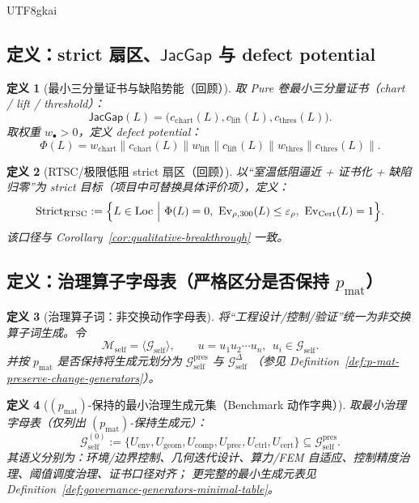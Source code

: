 \documentclass[12pt]{article}
\newtheorem{definition}{定义}[section]
\newcommand{\JacGap}{\ensuremath{\mathsf{JacGap}}}
\newcommand{\RTSC}{\textsf{RTSC}}
\begin{document}
\begin{CJK*}{UTF8}{gkai}
\subsection{定义：strict 扇区、$\JacGap$ 与 defect potential}

\begin{definition}[最小三分量证书与缺陷势能（回顾）]
\label{def:markdown-jacgap-phi}
取 Pure 卷最小三分量证书（chart / lift / threshold）：
\[
\JacGap(L)=\bigl(c_{\mathrm{chart}}(L),c_{\mathrm{lift}}(L),c_{\mathrm{thres}}(L)\bigr).
\]
取权重 $w_\bullet>0$，定义 defect potential：
\[
\Phi(L)=w_{\mathrm{chart}}\|c_{\mathrm{chart}}(L)\|
w_{\mathrm{lift}}\|c_{\mathrm{lift}}(L)\|
w_{\mathrm{thres}}\|c_{\mathrm{thres}}(L)\|.
\]
\end{definition}

\begin{definition}[\RTSC{}/极限低阻 strict 扇区（回顾）]
\label{def:markdown-strict-sector}
以“室温低阻逼近 + 证书化 + 缺陷归零”为 strict 目标（项目中可替换具体评价项），定义：
\[
\mathrm{Strict}_{\mathrm{RTSC}}
:=
\Bigl\{
L\in\mathrm{Loc}\ \Big|\ \Phi(L)=0,\ \mathrm{Ev}_{\rho,300}(L)\le \varepsilon_\rho,\ \mathrm{Ev}_{\mathrm{Cert}}(L)=1
\Bigr\}.
\]
该口径与 Corollary~\ref{cor:qualitative-breakthrough} 一致。
\end{definition}

\subsection{定义：治理算子字母表（严格区分是否保持 $p_{\mathrm{mat}}$）}

\begin{definition}[治理算子词：非交换动作字母表]
\label{def:markdown-governance-words}
将“工程设计/控制/验证”统一为非交换算子词生成。令
\[
\mathcal{M}_{\mathrm{self}}=\langle\mathcal{G}_{\mathrm{self}}\rangle,\qquad
u=u_1u_2\cdots u_n,\ \ u_i\in\mathcal{G}_{\mathrm{self}}.
\]
并按 $p_{\mathrm{mat}}$ 是否保持将生成元划分为
$\mathcal{G}_{\mathrm{self}}^{\mathrm{pres}}$ 与 $\mathcal{G}_{\mathrm{self}}^{\Delta}$
（参见 Definition~\ref{def:p-mat-preserve-change-generators}）。
\end{definition}

\begin{definition}[$(p_{\mathrm{mat}})$-保持的最小治理生成元集（Benchmark 动作字典）]
\label{def:markdown-minimal-governance-generators}
取最小治理字母表（仅列出 $(p_{\mathrm{mat}})$-保持生成元）：
\[
\mathcal{G}_{\mathrm{self}}^{(0)}
:=
\bigl\{
U_{\mathrm{env}},U_{\mathrm{geom}},U_{\mathrm{comp}},U_{\mathrm{prec}},U_{\mathrm{ctrl}},U_{\mathrm{cert}}
\bigr\}\subseteq \mathcal{G}_{\mathrm{self}}^{\mathrm{pres}}.
\]
其语义分别为：环境/边界控制、几何迭代设计、算力/FEM 自适应、控制精度治理、阈值调度治理、证书口径对齐；
更完整的最小生成元表见 Definition~\ref{def:governance-generators-minimal-table}。
\end{definition}


\end{CJK*}
\end{document}
